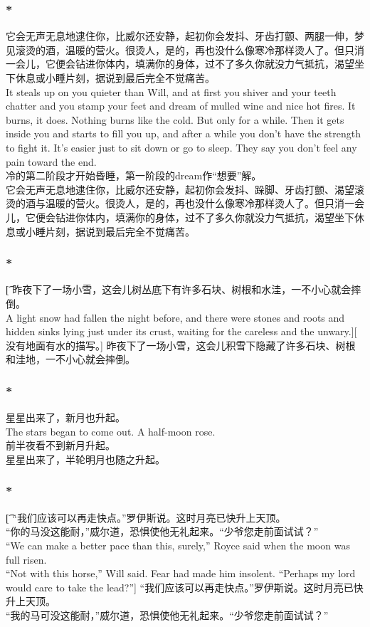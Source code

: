 \documentclass[12pt,a4paper]{article}
\begin{document}
\subsubsection{\color{red}*}{\color{blue}
它会无声无息地逮住你，比威尔还安静，起初你会发抖、牙齿打颤、两腿一伸，梦见滚烫的酒，温暖的营火。很烫人，是的，再也没什么像寒冷那样烫人了。但只消一会儿，它便会钻进你体内，填满你的身体，过不了多久你就没力气抵抗，渴望坐下休息或小睡片刻，据说到最后完全不觉痛苦。\\
It steals up on you quieter than Will, and at first you shiver and your teeth chatter and you stamp your feet and dream of mulled wine and nice hot fires. It burns, it does. Nothing burns like the cold. But only for a while. Then it gets inside you and starts to fill you up, and after a while you don't have the strength to fight it. It's easier just to sit down or go to sleep. They say you don't feel any pain toward the end.}\\
{\color{red}冷的第二阶段才开始昏睡，第一阶段的dream作“想要”解。}\\
它会无声无息地逮住你，比威尔还安静，起初你会发抖、跺脚、牙齿打颤、渴望滚烫的酒与温暖的营火。很烫人，是的，再也没什么像寒冷那样烫人了。但只消一会儿，它便会钻进你体内，填满你的身体，过不了多久你就没力气抵抗，渴望坐下休息或小睡片刻，据说到最后完全不觉痛苦。

\subsubsection{\color{red}*}\t[
昨夜下了一场小雪，这会儿树丛底下有许多石块、树根和水洼，一不小心就会摔倒。\\
A light snow had fallen the night before, and there were stones and roots and hidden sinks lying just under its crust, waiting for the careless and the unwary.][
没有地面有水的描写。]
昨夜下了一场小雪，这会儿积雪下隐藏了许多石块、树根和洼地，一不小心就会摔倒。

\subsubsection{\color{red}*}{\color{blue}
星星出来了，新月也升起。\\
The stars began to come out. A half-moon rose.}\\
{\color{red}前半夜看不到新月升起。}\\
星星出来了，半轮明月也随之升起。
	
\subsubsection{\color{red}*}\t[	
“我们应该可以再走快点。”罗伊斯说。这时月亮已快升上天顶。\\
“你的马没这能耐，”威尔道，恐惧使他无礼起来。“少爷您走前面试试？”\\
“We can make a better pace than this, surely,” Royce said when the moon was full risen.\\
“Not with this horse,” Will said. Fear had made him insolent. “Perhaps my lord would care to take the lead?”]
“我们应该可以再走快点。”罗伊斯说。这时月亮已快升上天顶。\\
“我的马可没这能耐，”威尔道，恐惧使他无礼起来。“少爷您走前面试试？”
	
\end{document}
